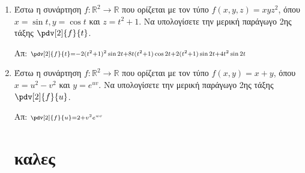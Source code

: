 \begin{enumerate}
 \item Έστω η συνάρτηση $ f : \mathbb{R}^{2} \to \mathbb{R} $ που ορίζεται με τον τύπο $ f(x,y,z) =
	 xyz^{2}$, όπου $ x = \sin{t}, y = \cos{t} $ και $ z = t^{2}+1 $. Να υπολογίσετε την μερική
	 παράγωγο 2ης τάξης $ \pdv[2]{f}{t} $.

	 \hfill Απ: $\scriptstyle{\pdv[2]{f}{t} = -2(t^{2}+1)^{2} \sin{2t} + 8t(t^{2}+1) \cos{2t} +
	 2(t^{2}+1) \sin{2t} + 4t^{2} \sin{2t}}$

 \item Έστω η συνάρτηση $ f : \mathbb{R}^{2} \to \mathbb{R} $ που ορίζεται με τον τύπο $ f(x,y) =
	 x+y$, όπου $ x = u^{2} - v^{2} $ και $ y = e^{uv} $. Να υπολογίσετε την μερική παράγωγο 2ης
	 τάξης $ \pdv[2]{f}{u} $.

	 \hfill Απ: $ \scriptstyle{\pdv[2]{f}{u} = 2 + v^{2}e^{uv}} $



     \section{καλες}






	


 



\end{enumerate}
